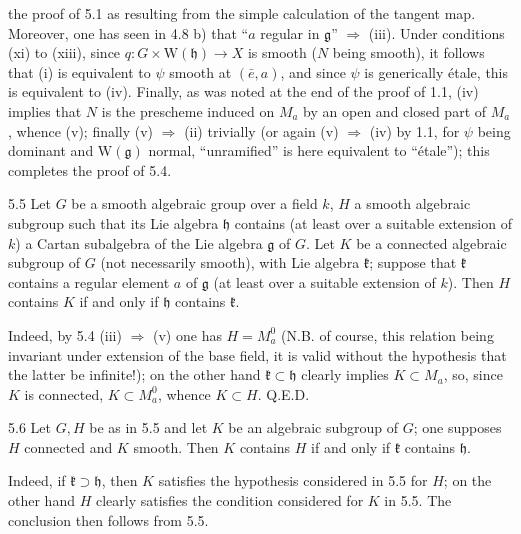 the proof of 5.1 as resulting from the simple calculation of the
tangent map. Moreover, one has seen in 4.8 b) that ``$a$ regular
in $\mathfrak g$'' $\Rightarrow$ (iii). Under conditions (xi) to
(xiii), since $q:G\times\mathrm W(\mathfrak h)\to X$ is smooth
($N$ being smooth), it follows that (i) is equivalent to $\psi$
smooth at $(\bar e,a)$, and since $\psi$ is generically \'etale,
this is equivalent to (iv). Finally, as was noted at the end of
the proof of 1.1, (iv) implies that $N$ is the prescheme induced
on $M_a$ by an open and closed part of $M_a$, whence (v); finally
(v) $\Rightarrow$ (ii) trivially (or again (v) $\Rightarrow$ (iv)
by 1.1, for $\psi$ being dominant and $\mathrm W(\mathfrak g)$
normal, ``unramified'' is here equivalent to ``\'etale''); this
completes the proof of 5.4.

\begin{corollary}{5.5}\label{XIII.5.5}
Let $G$ be a smooth algebraic group over a field $k$, $H$ a smooth
algebraic subgroup such that its Lie algebra $\mathfrak h$ contains
(at least over a suitable extension of $k$) a Cartan subalgebra of
the Lie algebra $\mathfrak g$ of $G$. Let $K$ be a connected
algebraic subgroup of $G$ (not necessarily smooth), with Lie algebra
$\mathfrak k$; suppose that $\mathfrak k$ contains a regular element
$a$ of $\mathfrak g$ (at least over a suitable extension of $k$).
Then $H$ contains $K$ if and only if $\mathfrak h$ contains
$\mathfrak k$.
\end{corollary}
Indeed, by 5.4 (iii) $\Rightarrow$ (v) one has $H=M_a^0$ (N.B.
of course, this relation being invariant under extension of the
base field, it is valid without the hypothesis that the latter
be infinite!); on the other hand $\mathfrak k\subset\mathfrak h$
clearly implies $K\subset M_a$, so, since $K$ is connected,
$K\subset M_a^0$, whence $K\subset H$. \hfill Q.E.D.

\begin{corollary}{5.6}\label{XIII.5.6}
Let $G,H$ be as in 5.5 and let $K$ be an algebraic subgroup of
$G$; one supposes $H$ connected and $K$ smooth. Then $K$ contains
$H$ if and only if $\mathfrak k$ contains $\mathfrak h$.
\end{corollary}
Indeed, if $\mathfrak k\supset\mathfrak h$, then $K$ satisfies
the hypothesis considered in 5.5 for $H$; on the other hand $H$
clearly satisfies the condition considered for $K$ in 5.5. The
conclusion then follows from 5.5.

